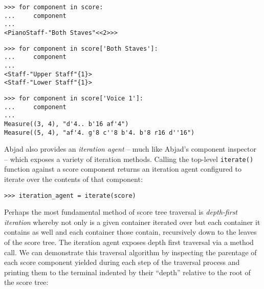 \begin{comment}
<abjad>
for component in score:
    component

for component in score['Both Staves']:
    component

for component in score['Voice 1']:
    component

</abjad>
\end{comment}

\begin{abjadbookoutput}
\begin{singlespacing}
\vspace{-0.5\baselineskip}
\begin{verbatim}
>>> for component in score:
...     component
...
<PianoStaff-"Both Staves"<<2>>>
\end{verbatim}
\begin{verbatim}
>>> for component in score['Both Staves']:
...     component
...
<Staff-"Upper Staff"{1}>
<Staff-"Lower Staff"{1}>
\end{verbatim}
\begin{verbatim}
>>> for component in score['Voice 1']:
...     component
...
Measure((3, 4), "d'4.. b'16 af'4")
Measure((5, 4), "af'4. g'8 c''8 b'4. b'8 r16 d''16")
\end{verbatim}
\end{singlespacing}
\end{abjadbookoutput}

\noindent Abjad also provides an \emph{iteration agent} -- much like Abjad's
component inspector -- which exposes a variety of iteration methods. Calling
the top-level \texttt{iterate()} function against a score component returns an
iteration agent configured to iterate over the contents of that component:

\begin{comment}
<abjad>
iteration_agent = iterate(score)
</abjad>
\end{comment}

\begin{abjadbookoutput}
\begin{singlespacing}
\vspace{-0.5\baselineskip}
\begin{verbatim}
>>> iteration_agent = iterate(score)
\end{verbatim}
\end{singlespacing}
\end{abjadbookoutput}

\noindent Perhaps the most fundamental method of score tree traversal is
\emph{depth-first iteration}\cite{cormen2009introduction} whereby not only is a
given container iterated over but each container it contains as well and each
container those contain, recursively down to the leaves of the score tree. The
iteration agent exposes depth first traversal via a method call. We can
demonstrate this traversal algorithm by inspecting the parentage of each score
component yielded during each step of the traversal process and printing them
to the terminal indented by their \enquote{depth} relative to the root of the
score tree:

